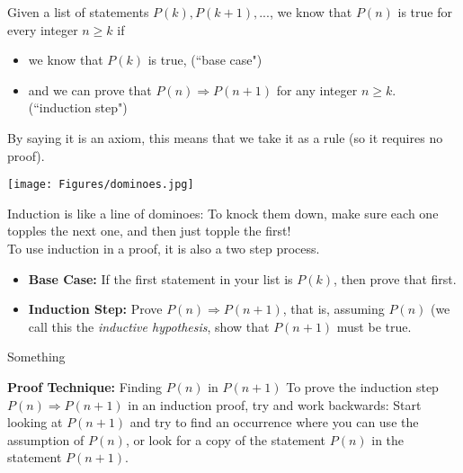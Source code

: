 \documentclass[11pt,dvipsnames]{book}
\numberwithin{equation}{section} %
\numberwithin{figure}{section} %
\numberwithin{table}{section} %
\begin{document}
\begin{theorem}
Given a list of statements $P(k),P(k+1),...$, we know that $P(n)$ is true for every integer $n\geqslant k$ if

\begin{itemize}
\item we know that $P(k)$ is \textcolor[rgb]{1.00,0.00,0.50}{true}, (``base case")

\item and we can \textcolor[rgb]{0.50,0.00,0.50}{prove} that $P(n)\Rightarrow P(n+1)$ for any integer $n\geqslant k$. (``induction step")
\end{itemize}
\end{theorem}

\vspace{10pt}
By saying it is an axiom, this means that we take it as a rule (so it requires no proof). 

\begin{multicols}{2}
\begin{center}
 \texttt{[image: Figures/dominoes.jpg]}
\end{center}
Induction is like a line of dominoes: To knock them down, make sure each one topples the next one, and then just topple the first! \\

To use induction in a proof, it is also a two step process. 
\begin{itemize}
\item {\bf Base  Case:} If the first statement in your list is $P(k)$, then prove that first.
\item {\bf Induction Step:} Prove $P(n)\Rightarrow P(n+1)$, that is, assuming $P(n)$ (we call this the {\it inductive hypothesis}, show that $P(n+1)$ must be true.
\end{itemize}

\end{multicols}

\begin{definition}
Something
\end{definition}




{\bf Proof Technique:} Finding $P(n)$ in $P(n+1)$
To prove the induction step $P(n)\Rightarrow P(n+1)$ in an induction proof, try and work backwards: Start looking at  $P(n+1)$ and try to find an occurrence where you can use the assumption of $P(n)$, or look for a copy of the statement $P(n)$ in the statement $P(n+1)$. 
\end{document}
